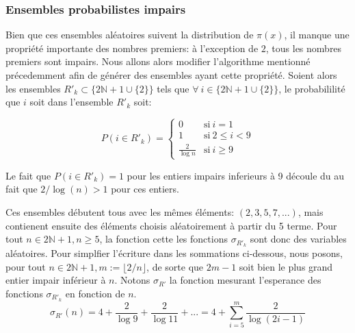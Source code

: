 \documentclass[../main.tex]{report}
\begin{document}
    \label{sec:odd_prob}
\subsubsection{Ensembles probabilistes impairs}
Bien que ces ensembles aléatoires suivent la distribution de $\pi(x)$, il manque une propriété importante des nombres premiers: à l'exception de $2$, tous les nombres premiers sont impairs.
Nous allons alors modifier l'algorithme mentionné précedemment afin de générer des ensembles ayant cette propriété. 
Soient alors les ensembles $R'_{k} \subset \{2\mathbb{N}+1 \cup \{2\}\}$ tels que $\forall~i \in \{2\mathbb{N}+1 \cup \{2\}\}$, le probabililité que $i$ soit dans l'ensemble $R'_{k}$ soit:

\[
P(i \in R'_{k}) = 
\left\{ 
    \begin{array}{cl}
         0 & \mbox{si}~i = 1 \\
         1 & \mbox{si}~ 2 \leq i < 9 \\
         \frac{2}{\log n} & \mbox{si}~i \geq 9
    \end{array}
\right.
\]

Le fait que $P(i \in R'_{k}) = 1$ pour les entiers impairs inferieurs à 9 découle du au fait que $2/\log(n) > 1$ pour ces entiers.

Ces ensembles débutent tous avec les mêmes éléments: $ (2,3,5,7,...) $, mais contienent ensuite des éléments choisis aléatoirement à partir du 5 terme. 
Pour tout $n \in 2\mathbb{N}+1, n\geq 5$, la fonction cette les fonctions $\sigma_{R'_k}$ sont donc des variables aléatoires. Pour simplfier l'écriture dans les sommations ci-dessous, nous posons, pour tout $n \in 2\mathbb{N} + 1, m:= \lfloor 2/n \rfloor$, de sorte que $2m-1$ soit bien le plus grand entier impair inférieur à $n$.
Notons $\sigma_{R'}$ la fonction mesurant l'esperance des fonctions $\sigma_{R'_k}$ en fonction de $n$.
\[
\sigma_{R'}(n)
= 4 + \frac{2}{\log 9} + \frac{2}{\log 11} + ...
= 4 + \sum_{i=5}^m \frac{2}{\log (2i-1)}
\]
\end{document}
